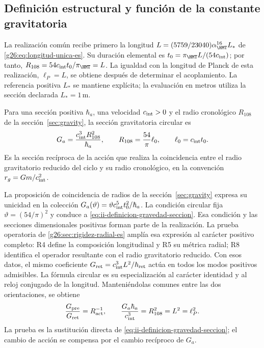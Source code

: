 \subsection{Definición estructural y función de la constante gravitatoria}
\label{sec:ii-definicion-gravedad}

La realización común recibe primero la longitud
\(L=(5759/23040)\alpha_{\HMT}^{16}L_*\) de
\eqref{g26:eq:longitud-unica-es}. Su duración elemental es
\(t_0=\pi_{\HMT}L/(54c_{\rm int})\); por tanto,
\(R_{108}=54c_{\rm int}t_0/\pi_{\HMT}=L\).
La igualdad con la longitud de Planck de esta realización,
\(\ell_P=L\), se obtiene después de determinar el acoplamiento.
La referencia positiva \(L_*\) se mantiene explícita; la evaluación
en metros utiliza la sección declarada \(L_*=1\,\mathrm m\).

\begin{definition}
Para una sección positiva \(\hbar_a\), una velocidad
\(c_{\rm int}>0\) y el radio cronológico \(R_{108}\) de la
sección~\ref{sec:gravity}, la sección gravitatoria circular es
\begin{equation}
 G_a=\frac{c_{\rm int}^{3}R_{108}^{2}}{\hbar_a},
 \qquad R_{108}=\frac{54}{\pi}\ell_0,
 \qquad \ell_0=c_{\rm int}t_0.
 \label{eq:ii-definicion-gravedad-seccion}
\end{equation}
Es la sección recíproca de la acción que realiza la coincidencia
entre el radio gravitatorio reducido del ciclo y su radio
cronológico, en la convención \(r_g=Gm/c_{\rm int}^2\).
\end{definition}

La proposición de coincidencia de radios de la
sección~\ref{sec:gravity} expresa su unicidad en la colección
\(G_a(\vartheta)=\vartheta c_{\rm int}^{5}t_0^2/\hbar_a\).
La condición circular fija \(\vartheta=(54/\pi)^2\) y conduce
a \eqref{eq:ii-definicion-gravedad-seccion}. Esa condición y las
secciones dimensionales positivas forman parte de la realización.
La prueba operatoria de \ref{g26:sec:rigidez-radial-es} amplía esa
expresión al carácter positivo completo: R4 define la composición
longitudinal y R5 su métrica radial; R8 identifica el operador resultante
con el radio gravitatorio reducido. Con esos datos, el mismo coeficiente
\(G_{\rm ret}=c_{\rm int}^3L^2/\hbar_{\rm ret}\) actúa en todos
los modos positivos admisibles. La fórmula circular es su especialización
al carácter identidad y al reloj conjugado de la longitud.
Manteniéndolas comunes entre las dos orientaciones, se obtiene
\begin{equation}
 \frac{G_{\mathrm{pre}}}{G_{\mathrm{ret}}}
 =R_{\mathrm{act}}^{-1},
 \qquad
 \frac{G_a\hbar_a}{c_{\rm int}^{3}}
 =R_{108}^{2}=L^2=\ell_P^2.
 \label{eq:ii-definicion-gravedad-area}
\end{equation}
La prueba es la sustitución directa de
\eqref{eq:ii-definicion-gravedad-seccion}; el cambio de acción
se compensa por el cambio recíproco de \(G_a\).

